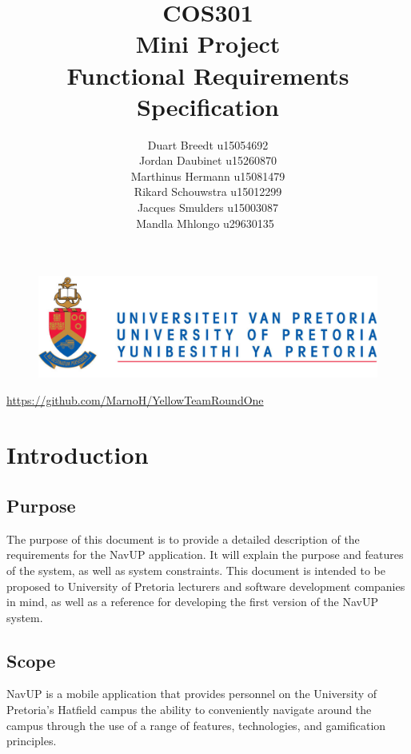 \documentclass[12pt]{article}
\begin{document}
	

	\begin{figure}
		\includegraphics[width=\linewidth]{logo.jpg}	
	\end{figure}

	\title 	{
				COS301\\
				Mini Project\\
				Functional Requirements Specification
		   	}
	\author {
				Duart Breedt u15054692\\
				Jordan Daubinet u15260870\\
				Marthinus Hermann u15081479\\
				Rikard Schouwstra u15012299\\
				Jacques Smulders u15003087\\
				Mandla Mhlongo u29630135\
			}
	\maketitle
	\begin{center}
			\url{https://github.com/MarnoH/YellowTeamRoundOne}	
	\end{center}
	\newpage
	\tableofcontents
	\newpage
	\section{Introduction}
		
	\subsection{Purpose}
		The purpose of this document is to provide a detailed description of the requirements for the NavUP application. It will explain the purpose and features of the system, as well as system constraints.
This document is intended to be proposed to University of Pretoria lecturers and software development companies in mind, as well as a reference for developing the first version of the NavUP system.
		
	\subsection{Scope}
		NavUP is a mobile application that provides personnel on the University of Pretoria’s Hatfield campus the ability to conveniently navigate around the campus through the use of a range of features, technologies, and gamification principles.\\
\end{document}
